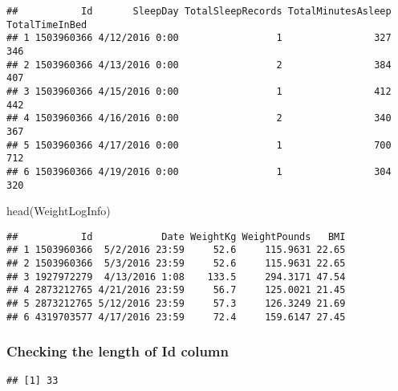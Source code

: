 \documentclass[
]{article}
\newenvironment{Shaded}{\begin{snugshade}}{\end{snugshade}}
\newcommand{\FunctionTok}[1]{\textcolor[rgb]{0.00,0.00,0.00}{#1}}
\newcommand{\NormalTok}[1]{#1}
\newcommand{\SpecialCharTok}[1]{\textcolor[rgb]{0.00,0.00,0.00}{#1}}
\begin{document}
\begin{verbatim}
##           Id       SleepDay TotalSleepRecords TotalMinutesAsleep TotalTimeInBed
## 1 1503960366 4/12/2016 0:00                 1                327            346
## 2 1503960366 4/13/2016 0:00                 2                384            407
## 3 1503960366 4/15/2016 0:00                 1                412            442
## 4 1503960366 4/16/2016 0:00                 2                340            367
## 5 1503960366 4/17/2016 0:00                 1                700            712
## 6 1503960366 4/19/2016 0:00                 1                304            320
\end{verbatim}

\begin{Shaded}
\begin{Highlighting}[]
\FunctionTok{head}\NormalTok{(WeightLogInfo)}
\end{Highlighting}
\end{Shaded}

\begin{verbatim}
##           Id            Date WeightKg WeightPounds   BMI
## 1 1503960366  5/2/2016 23:59     52.6     115.9631 22.65
## 2 1503960366  5/3/2016 23:59     52.6     115.9631 22.65
## 3 1927972279  4/13/2016 1:08    133.5     294.3171 47.54
## 4 2873212765 4/21/2016 23:59     56.7     125.0021 21.45
## 5 2873212765 5/12/2016 23:59     57.3     126.3249 21.69
## 6 4319703577 4/17/2016 23:59     72.4     159.6147 27.45
\end{verbatim}

\hypertarget{checking-the-length-of-id-column}{%
\subsubsection{Checking the length of Id
column}\label{checking-the-length-of-id-column}}

\begin{Shaded}
\end{Shaded}

\begin{verbatim}
## [1] 33
\end{verbatim}

\begin{Shaded}
\end{Shaded}
\end{document}
